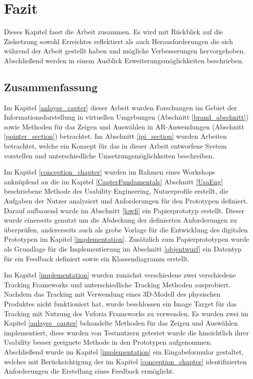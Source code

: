 \chapter{Fazit}

Dieses Kapitel fasst die Arbeit zusammen. Es wird mit Rückblick auf die Zielsetzung sowohl Erreichtes reflektiert als auch Herausforderungen die sich während der Arbeit gestellt haben und mögliche Verbesserungen hervorgehoben. Abschließend werden in einem Ausblick Erweiterungsmöglichkeiten beschrieben. 

\section{Zusammenfassung}

Im Kapitel \ref{anlayse_capter} dieser Arbeit wurden Forschungen im Gebiet der Informationsdarstellung in virtuellen Umgebungen (Abschnitt \ref{brand_abschnitt}) sowie Methoden für das 
Zeigen und Auswählen in AR-Anwendungen (Abschnitt \ref{pointer_section}) betrachtet. Im Abschnitt \ref{ipi_section} wurden Arbeiten betrachtet, welche ein Konzept für das in dieser Arbeit entworfene System vorstellen
und unterschiedliche Umsetzungsmöglichkeiten beschreiben. 

Im Kapitel \ref{conception_chapter} wurden im Rahmen eines Workshops anknüpfend an die im Kapitel \ref{CapterFundamentals} Abschnitt \ref{UsaEng} beschriebene Methode des Usability Engineering, Nutzerprofile erstellt, die Aufgaben 
der Nutzer analysiert und Anforderungen für den Prototypen definiert. Darauf aufbauend wurde im Abschnitt \ref{lowfi} ein Papierprototyp erstellt. Dieser wurde einerseits genutzt um die Abdeckung der definierten Anforderungen 
zu überprüfen, andererseits auch als grobe Vorlage für die Entwicklung des digitalen Prototypen im Kapitel \ref{implementation}. Zusätzlich zum Papierprototypen wurde als Grundlage für die Implementierung im Abschnitt \ref{objentwurf} ein Datentyp für ein Feedback definiert sowie ein Klassendiagramm erstellt. 

Im Kapitel \ref{implementation} wurden zunächst verschiedene zwei verschiedene Tracking Frameworks und unterschiedliche Tracking Methoden ausprobiert. 
Nachdem das Tracking mit Verwendung eines 3D-Modell des physischen Produktes nicht funktioniert hat, wurde beschlossen ein Image Target für das Tracking mit Nutzung
des Vuforia Frameworks zu verwenden. 
Es wurden zwei im Kapitel \ref{anlayse_capter} behandelte Methoden für das Zeigen und Auswählen implementiert, diese wurden von Testnutzern getestet wurde die hinsichtlich ihrer Usability besser geeignete Methode in den Prototypen aufgenommen. Abschließend wurde im Kapitel \ref{implementation} ein Eingabeformular
gestaltet, welches mit Berücksichtigung der im Kapitel \ref{conception_chapter} identifizierten Anforderungen die Erstellung eines Feedback ermöglicht.  

